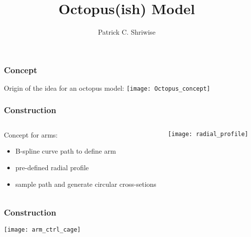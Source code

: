 \documentclass[14pt]{beamer}
\begin{document}
\graphicspath{ {./figures/} }

\title{Octopus(ish) Model}
\author{Patrick C. Shriwise}


\maketitle


\begin{frame}
\frametitle{Concept}
\begin{center}
Origin of the idea for an octopus model:
\vfill
\texttt{[image: Octopus\_concept]}
\end{center}

\end{frame}

\begin{frame}
\frametitle{Construction}

\begin{columns}[T]
\begin{column}{0.48\textwidth}
Concept for arms:
\begin{itemize}
\item B-spline curve path to define arm
\item pre-defined radial profile
\item sample path and generate circular cross-setions
\end{itemize}
\end{column}

\hfill

\begin{column}{0.48\textwidth}
\begin{center}
\texttt{[image: radial\_profile]}
\end{center}
\end{column}
\end{columns}

\end{frame}


\begin{frame}
\frametitle{Construction}

\begin{center}
\texttt{[image: arm\_ctrl\_cage]}
\end{center}

\end{frame}
\end{document}
